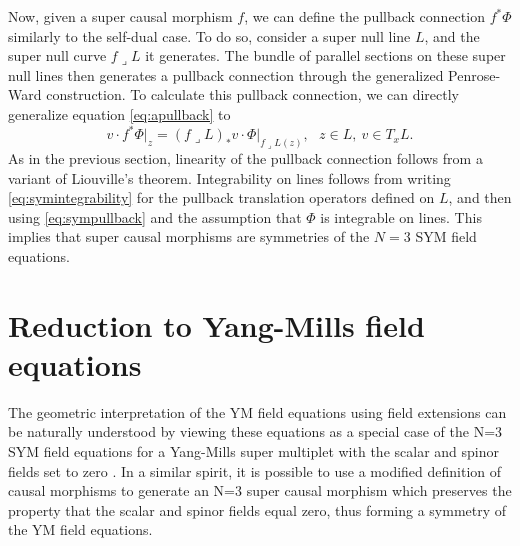 \documentclass[12pt]{article}
\newcommand{\spoint}{z}
\begin{document}
Now, given a super causal morphism $f$, we can define the pullback connection $f^*\Phi$ similarly to the self-dual case.  To do so, consider a super null line $L$, and the super null curve $f\lrcorner L$ it generates.  The bundle of parallel sections on these super null lines then generates a pullback connection through the generalized Penrose-Ward construction.  To calculate this pullback connection, we can directly generalize equation \eqref{eq:apullback} to
\begin{equation}\label{eq:sympullback}
v \cdot f^*\Phi\lvert_{\spoint}=(f\lrcorner L)_*v \cdot \Phi\lvert_{f\lrcorner L(\spoint)}, \ \ \  \spoint\in L, \ v\in T_x L.
\end{equation}
As in the previous section, linearity of the pullback connection follows from a variant of Liouville's theorem.  Integrability on lines follows from writing \eqref{eq:symintegrability} for the pullback translation operators defined on $L$, and then using \eqref{eq:sympullback} and the assumption that $\Phi$ is integrable on lines.  This implies that super causal morphisms are symmetries of the $N=3$ SYM field equations.

\section{Reduction to Yang-Mills field equations}

The geometric interpretation of the YM field equations using field extensions can be naturally understood by viewing these equations as a special case of the N=3 SYM field equations for a Yang-Mills super multiplet with the scalar and spinor fields set to zero \cite{WITTEN1978394}\cite{Harnad1985Constraint}\cite{harnad1989supersymmetric}\cite{10.2307/2000661}. In a similar spirit, it is possible to use a modified definition of causal morphisms to generate an N=3 super causal morphism which preserves the property that the scalar and spinor fields equal zero, thus forming a symmetry of the YM field equations.  
\end{document}
